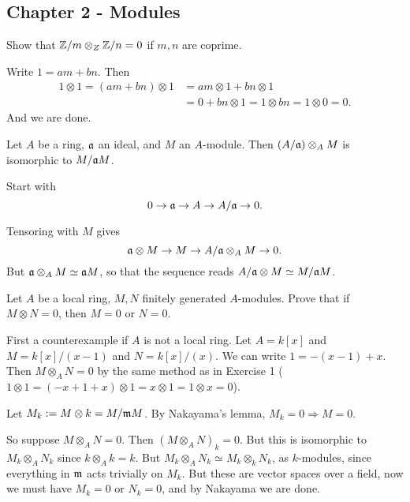 \documentclass[11pt, english]{article}
\begin{document}
\subsection{Chapter 2 - Modules}

\begin{exc}[Excercise 1]
Show that $\mathbb{Z}/m \otimes_Z \mathbb{Z}/n = 0$ if $m,n$ are coprime.
\end{exc}
\begin{sol}
Write $1=am+bn$. Then 
\begin{align*}
1 \otimes 1 = (am+bn) \otimes 1 &= am \otimes 1 + bn \otimes 1 \\
&=  0 + bn \otimes 1 = 1 \otimes bn = 1 \otimes 0 = 0.
\end{align*}
And we are done.
\end{sol}

\begin{exc}[Exercise 2]
 Let $A$ be a ring, $\mathfrak{a}$ an ideal, and $M$ an $A$-module. Then $(A/\mathfrak{a}) \otimes_A M$ is isomorphic to $M/\mathfrak{a} M$.
\end{exc}
\begin{sol}
Start with
\[
0 \to \mathfrak{a} \to A \to A/ \mathfrak{a} \to 0.
\]

Tensoring with $M$ gives
\[
\mathfrak{a} \otimes M  \to M \to A/\mathfrak{a} \otimes_A M \to 0.
\]
But $\mathfrak{a} \otimes_A M \simeq \mathfrak{a} M$, so that the sequence reads $A/\mathfrak{a} \otimes M \simeq M/\mathfrak{a} M$.
\end{sol}

\begin{exc}[Exercise 3]
 Let $A$ be a local ring, $M,N$ finitely generated $A$-modules. Prove that if $M \otimes N=0$, then $M=0$ or $N = 0$. 
\end{exc}
\begin{sol}
First a counterexample if $A$ is not a local ring. Let $A=k[x]$ and $M=k[x]/(x-1)$ and $N=k[x]/(x)$. We can write $1 = -(x-1) + x$. Then $M \otimes_A N = 0$ by the same method as in Exercise 1 ($1 \otimes 1 = (-x+1 + x) \otimes 1 = x \otimes 1 = 1 \otimes x = 0$). 

Let $M_k := M \otimes k = M/\mathfrak{m} M$. By Nakayama's lemma, $M_k=0 \Rightarrow M=0$.

So suppose $M \otimes_A N=0$. Then $(M \otimes_A N)_k = 0$. But this is isomorphic to $M_k \otimes_A  N_k$ since $k \otimes_A k = k$. But $M_k \otimes_A N_k \simeq M_k \otimes_k N_k$, as $k$-modules, since everything in $\mathfrak{m}$ acts trivially on $M_k$. But these are vector spaces over a field, now we must have $M_k=0$ or $N_k=0$, and by Nakayama we are done.
\end{sol}
\end{document}
